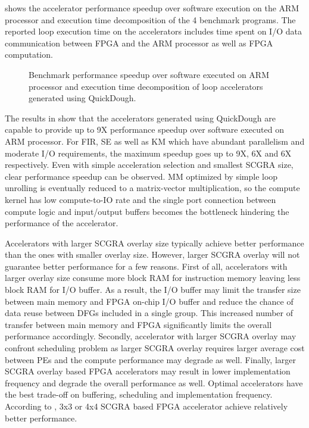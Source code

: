  shows the accelerator performance speedup over software execution on the ARM processor 
and execution time decomposition of the 4 benchmark programs. The reported loop execution
time on the accelerators includes time spent on I/O data communication between FPGA and the 
ARM processor as well as FPGA computation.

\begin{figure}
\centering
{}
\qquad
{}
\qquad
{}
\qquad
{}
\caption{Benchmark performance speedup over software executed on ARM processor and execution time 
    decomposition of loop accelerators generated using QuickDough.}
\label{fig:real-perf}
\end{figure}

The results in  show that the accelerators generated using QuickDough are 
capable to provide up to 9X performance speedup over software executed on ARM processor. For FIR, SE 
as well as KM which have abundant parallelism and moderate I/O requirements, the maximum speedup
goes up to 9X, 6X and 6X respectively. Even with simple acceleration selection and smallest SCGRA
size, clear performance speedup can be observed. MM optimized by simple loop unrolling is eventually reduced to
a matrix-vector multiplication, so the compute kernel has low compute-to-IO rate and the single port
connection between compute logic and input/output buffers becomes the bottleneck hindering
the performance of the accelerator.  

Accelerators with larger SCGRA overlay size typically achieve
better performance than the ones with smaller overlay size. However, larger SCGRA overlay will not
guarantee better performance for a few reasons. First of all, accelerators with larger overlay size consume
more block RAM for instruction memory leaving less block RAM for I/O buffer. As a result, the I/O
buffer may limit the transfer size between main memory and FPGA on-chip I/O buffer and reduce the
chance of data reuse between DFGs included in a single group. This increased number of transfer
between main memory and FPGA significantly limits the overall performance accordingly. Secondly, 
accelerator with larger SCGRA overlay may confront scheduling problem as larger SCGRA
overlay requires larger average cost between PEs and the compute performance may degrade as well.
Finally, larger SCGRA overlay based FPGA accelerators may result in lower implementation frequency
and degrade the overall performance as well. Optimal accelerators have the best trade-off on
buffering, scheduling and implementation frequency. According to , 3x3 or 4x4
SCGRA based FPGA accelerator achieve relatively better performance.


